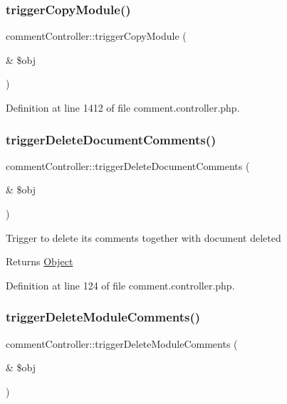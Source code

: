 \subsubsection{\texorpdfstring{trigger\+Copy\+Module()}{triggerCopyModule()}}
{\footnotesize\ttfamily comment\+Controller\+::trigger\+Copy\+Module (\begin{DoxyParamCaption}\item[{\&}]{\$obj }\end{DoxyParamCaption})}



Definition at line 1412 of file comment.\+controller.\+php.

\mbox{\label{classcommentController_ab209ef386bfb83c88a85bf4618237aca}} 
\subsubsection{\texorpdfstring{trigger\+Delete\+Document\+Comments()}{triggerDeleteDocumentComments()}}
{\footnotesize\ttfamily comment\+Controller\+::trigger\+Delete\+Document\+Comments (\begin{DoxyParamCaption}\item[{\&}]{\$obj }\end{DoxyParamCaption})}

Trigger to delete its comments together with document deleted \begin{DoxyReturn}{Returns}
\hyperlink{classObject}{Object} 
\end{DoxyReturn}


Definition at line 124 of file comment.\+controller.\+php.

\mbox{\label{classcommentController_a8c9ad7337a8522f82a4010f9f0afa274}} 
\subsubsection{\texorpdfstring{trigger\+Delete\+Module\+Comments()}{triggerDeleteModuleComments()}}
{\footnotesize\ttfamily comment\+Controller\+::trigger\+Delete\+Module\+Comments (\begin{DoxyParamCaption}\item[{\&}]{\$obj }\end{DoxyParamCaption})}

